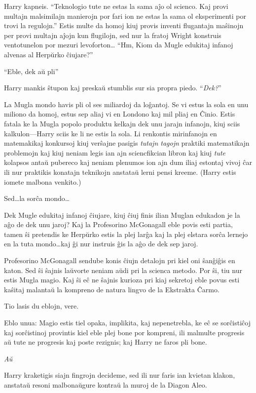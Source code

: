 Harry kapneis. ``Teknologio tute ne estas la sama aĵo ol scienco. Kaj
provi multajn malsimilajn manierojn por fari ion ne estas la sama ol
eksperimenti por trovi la regulojn.'' Estis multe da homoj kiuj provis
inventi flugantajn maŝinojn per provi multajn aĵojn kun flugilojn, sed
nur la fratoj Wright konstruis ventotunelon por mezuri levoforton\ldots
``Hm, Kiom da Mugle edukitaj infanoj alvenas al Herpŭrko ĉiujare?''

``Eble, dek aŭ pli''

Harry mankis ŝtupon kaj preskaŭ stumblis sur sia propra piedo. ``\emph{Dek?}''

La Mugla mondo havis pli ol ses miliardoj da loĝantoj. Se vi estus
la sola en unu miliono da homoj, estus sep aliaj vi en Londono kaj mil
pliaj en Ĉinio. Estis fatala ke la Mugla popolo produktu kelkajn dek
unu jarajn infanojn, kiuj sciis kalkulon—Harry sciis ke li ne estis la
sola. Li renkontis mirinfanojn en matemakikaj konkursoj kiuj verŝajne
pasigis \emph{tutajn tagojn} praktiki matematikajn problemojn kaj kiuj
neniam legis ian ajn sciencfikcian libron kaj kiuj \emph{tute}
kolapsos antaŭ pubereco kaj neniam plenumos ion ajn dum iliaj estontaj
vivoj ĉar ili nur praktikis konatajn teknikojn anstataŭ lerni pensi
kreeme. (Harry estis iomete malbona venkito.)

Sed\ldots la sorĉa mondo\ldots

Dek Mugle edukitaj infanoj ĉiujare, kiuj ĉiuj finis ilian Muglan
edukadon je la aĝo de dek unu jaroj? Kaj la Profesorino McGonagall
eble povis esti partia, tamen ŝi pretendis ke Herpŭrko estis la
plej larĝa kaj la plej elstara sorĉa lernejo en la tuta mondo\ldots kaj ĝi nur
instruis ĝis la aĝo de dek sep jaroj.

Profesorino McGonagall sendube konis ĉiujn detalojn pri kiel oni
ŝanĝiĝis en katon. Sed ŝi ŝajnis laŭvorte neniam aŭdi pri la scienca
metodo. Por ŝi, tiu nur estis Mugla magio. Kaj ŝi eĉ ne ŝajnis kurioza
pri kiaj sekretoj eble povus esti kaŝitaj malantaŭ la kompreno de
natura lingvo de la Ekstrakta Ĉarmo.

Tio lasis du eblojn, vere.

Eblo unua: Magio estis tiel opaka, implikita, kaj nepenetrebla, ke
eĉ se sorĉistiĉoj kaj sorĉistinoj provintis kiel eble plej bone por
kompreni, ili malmulte progresis aŭ tute ne progresis kaj poste
rezignis; kaj Harry ne faros pli bone.

\emph{Aŭ}

Harry kraketigis siajn fingrojn decideme, sed ili nur faris ian kvietan
klakon, anstataŭ resoni malbonaŭgure kontraŭ la muroj de la Diagon
Aleo.

